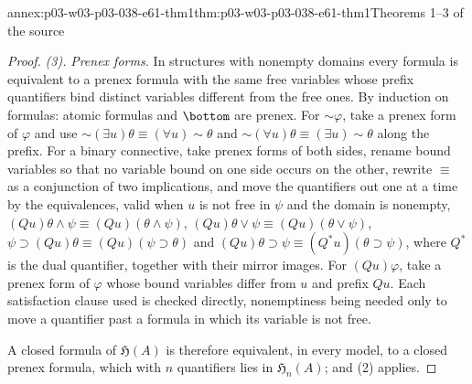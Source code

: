 \begin{annexitem}{annex:p03-w03-p03-038-e61-thm1}{thm:p03-w03-p03-038-e61-thm1}{Theorems 1--3 of the source}
\begin{proof}
\emph{(3).} \emph{Prenex forms.} In structures with nonempty domains
every formula is equivalent to a prenex formula with the same free
variables whose prefix quantifiers bind distinct variables different from
the free ones. By induction on formulas: atomic formulas and \(\bottom\)
are prenex. For \(\sim\varphi\), take a prenex form of \(\varphi\) and use
\(\sim(\exists u)\theta\equiv(\forall u)\sim\theta\) and
\(\sim(\forall u)\theta\equiv(\exists u)\sim\theta\) along the prefix. For a
binary connective, take prenex forms of both sides, rename bound variables
so that no variable bound on one side occurs on the other, rewrite
\(\equiv\) as a conjunction of two implications, and move the quantifiers
out one at a time by the equivalences, valid when \(u\) is not free in
\(\psi\) and the domain is nonempty,
\((Qu)\theta\wedge\psi\equiv(Qu)(\theta\wedge\psi)\),
\((Qu)\theta\vee\psi\equiv(Qu)(\theta\vee\psi)\),
\(\psi\supset(Qu)\theta\equiv(Qu)(\psi\supset\theta)\) and
\((Qu)\theta\supset\psi\equiv(Q^*u)(\theta\supset\psi)\), where \(Q^*\) is
the dual quantifier, together with their mirror images. For
\((Qu)\varphi\), take a prenex form of \(\varphi\) whose bound variables
differ from \(u\) and prefix \(Qu\). Each satisfaction clause used is
checked directly, nonemptiness being needed only to move a quantifier past
a formula in which its variable is not free.

A closed formula of \(\mathfrak H(A)\) is therefore equivalent, in every
model, to a closed prenex formula, which with \(n\) quantifiers lies in
\(\mathfrak H_n(A)\); and (2) applies.
\end{proof}
\end{annexitem}


